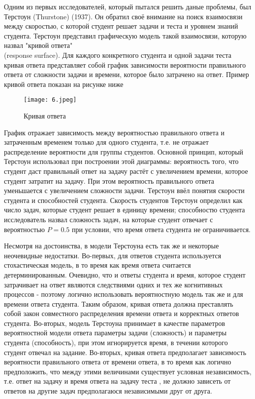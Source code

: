  Одним из первых исследователей, который пытался решить даные про\-блемы, был Терстоун (Thurstone) (1937). Он обратил своё внимание на поиск взаимосвязи между скоростью, с которой студент решает задачи и теста и уровнем знаний студента. Терстоун представил графическую модель такой взаимосвязи, которую назвал "кривой ответа" \\(response surface). Для каждого конкретного студента и одной задачи теста кривая ответа представляет собой график зависимости вероятности правиль\-ного ответа от сложности задачи и времени, которое было затрачено на ответ. Пример кривой ответа показан на рисунке ниже

\begin{figure}[ht!] 
\centering \texttt{[image: 6.jpeg]} 
\caption{Кривая ответа} 
\end{figure}

График отражает зависимость между вероятностью правильного ответа и затраченным временем только для одного студента, т.е. не отражает распре\-деление вероятности для группы студентов. Основной принцип, который Тер\-стоун использовал при построении этой диаграммы: вероятность того, что студент даст правильный ответ на задачу растёт с увеличением времени, которое студент затратит на задачу. При этом вероятность правиль\-ного ответа уменьшается с увеличением сложности задачи. Терстоун ввёл понятия скорости студента и способностей студента. Скорость студентов Терстоун определил как число задач, которые студент решает в единицу времени; способностю студента исследо\-ватель назвал сложность задач, на которые студент отвечает с вероятностью $P=0.5$ при условии, что время ответа студента не ограничи\-вается.

Несмотря на достоинства, в модели Терстоуна есть так же и некоторые неочевидные недостатки. Во-первых, для ответов студента используется сто\-хастическая модель, в то время как время ответа считается детерминирован\-ным. Очевидно, что и ответы студента и время, которое студент затрачивает на ответ являются следствиями одних и тех же когнитивных процессов - поэтому логично использовать вероятностную модель так же и для времени ответа студента. Таким образом, кривая ответа должна преставлять собой закон совместного распределения времени ответа и корректных ответов сту\-дента. Во-вторых, модель Терстоуна принимает в качестве параметров веро\-ятностной модели ответа парамет\-ры задачи (сложность) и параметры сту\-дента (способность), при этом игнорируется время, в течении которого студент отвечал на задание. Во-вторых, кривая ответа предпола\-гает зависимость ве\-роятности правильного ответа от времени ответа, в то время как логично предположить, что между этими величинами существует условная незави\-симость, т.е. ответ на задачу и время ответа на задачу теста , не должно зависеть от ответов на другие задач предполагаюся независимыми друг от друга. 

